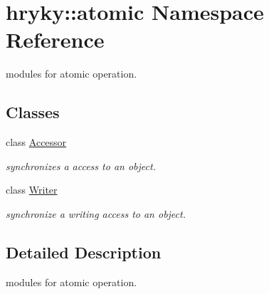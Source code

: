 \hypertarget{namespacehryky_1_1atomic}{\section{hryky\-:\-:atomic Namespace Reference}
\label{namespacehryky_1_1atomic}
}


modules for atomic operation.  


\subsection*{Classes}
\begin{DoxyCompactItemize}
\item 
class \hyperlink{classhryky_1_1atomic_1_1_accessor}{Accessor}
\begin{DoxyCompactList}\small\item\em synchronizes a access to an object. \end{DoxyCompactList}\item 
class \hyperlink{classhryky_1_1atomic_1_1_writer}{Writer}
\begin{DoxyCompactList}\small\item\em synchronize a writing access to an object. \end{DoxyCompactList}\end{DoxyCompactItemize}


\subsection{Detailed Description}
modules for atomic operation. 